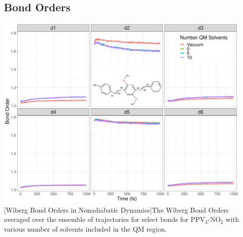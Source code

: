 \subsection{Bond Orders}
\noindent
\begin{minipage}[c]{\textwidth}
  \centering
  \includegraphics[width=5in]{../Paper2/Images/bond_order/solvent_comparison.png}
  [Wiberg Bond Orders in Nonadiabatic Dynamics]{The Wiberg Bond Orders averaged over the ensemble of trajectories for select bonds for PPV\(_3\)-NO\(_2\) with various number of solvents included in the QM region.}
  \label{bondOrderNonadiabatic}
\end{minipage}\bigskip
